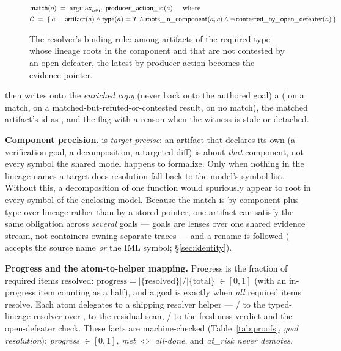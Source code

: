 \begin{figure}[H]
\centering
\small
\[
\begin{array}{@{}l@{}}
\id{match}(o) \;=\; \operatorname*{argmax}_{a \in \mathcal{C}}\; \id{producer\_action\_id}(a), \quad\text{where}\\[4pt]
\mathcal{C} \;=\; \{\, a \;\mid\; \id{artifact}(a) \land \id{type}(a) = T \land \id{roots\_in\_component}(a, c) \land \lnot\,\id{contested\_by\_open\_defeater}(a) \,\}
\end{array}
\]
\caption{The resolver's binding rule: among artifacts of the required type whose lineage roots in the component and that are not contested by an open defeater, the latest by producer action becomes the evidence pointer.}
\label{fig:goal-match}
\end{figure}

\noindent then writes onto the \emph{enriched copy} (never back onto the authored goal) a 
( on a match,  on a matched-but-refuted-or-contested result,  on no
match), the matched artifact's id as , and the  flag with a reason
when the witness is stale or detached.

\textbf{Component precision.}  is \emph{target-precise}: an artifact that
declares its own  (a verification goal, a decomposition, a targeted diff) is about
\emph{that} component, not every symbol the shared model happens to formalize. Only when nothing in the
lineage names a target does resolution fall back to the model's symbol list. Without this, a
decomposition of one function would spuriously appear to root in every symbol of the enclosing model.
Because the match is by component-plus-type over lineage rather than by a stored pointer, one artifact
can satisfy the same obligation across \emph{several} goals --- goals are lenses over one shared evidence
stream, not containers owning separate traces --- and a rename is followed
( accepts the source name \emph{or} the IML symbol; \S\ref{sec:identity}).

\textbf{Progress and the atom-to-helper mapping.} Progress is the fraction of required items resolved:
\(\text{progress} = |\{\text{resolved}\}| / |\{\text{total}\}| \in [0,1]\) (with an in-progress item
counting as a half), and a goal is  exactly when \emph{all} required items resolve. Each atom
delegates to a shipping resolver helper --- / to the typed-lineage resolver over
,  to the residual scan, /
to the freshness verdict and the open-defeater check. These facts are machine-checked
(Table~\ref{tab:proofs}, \emph{goal resolution}): \emph{progress} \(\in [0,1]\),
\emph{met $\Leftrightarrow$ all-done}, and \emph{at\_risk never demotes}.

